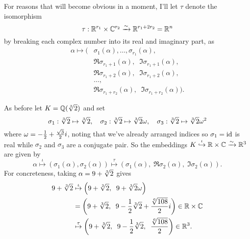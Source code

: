 For reasons that will become obvious in a moment, I'll let $\tau$ denote the isomorphism
\[
	\tau : \mathbb R^{r_1} \times \mathbb C^{r_2} \xrightarrow{\sim} \mathbb R^{r_1+2r_2} = \mathbb R^n
\]
by breaking each complex number into its real and imaginary part, as
\begin{align*}
\alpha \mapsto  \big(& \sigma_1(\alpha), \dots, \sigma_{r_1}(\alpha), \\
& \Re \sigma_{r_1+1}(\alpha), \;\; \Im \sigma_{r_1+1}(\alpha), \\
& \Re \sigma_{r_1+2}(\alpha), \;\; \Im \sigma_{r_1+2}(\alpha), \\
& \dots, \\
& \Re \sigma_{r_1+r_2}(\alpha), \;\; \Im \sigma_{r_1+r_2}(\alpha) \big). 
\end{align*}
\begin{example}
	As before let $K = \mathbb Q(\sqrt[3]{2})$ and set
	\[ \sigma_1 : \sqrt[3]{2} \mapsto \sqrt[3]{2},
		\quad
		\sigma_2 : \sqrt[3]{2} \mapsto \sqrt[3]{2} \omega,
		\quad
		\sigma_3 : \sqrt[3]{2} \mapsto \sqrt[3]{2} \omega^2 \]
	where $\omega = - \frac{1}{2} + \frac{\sqrt3}{2} i$,
	noting that we've already arranged indices so $\sigma_1 = \mathrm{id}$ is real
	while $\sigma_2$ and $\sigma_3$ are a conjugate pair.
	So the embeddings $K \overset\iota{\hookrightarrow} \mathbb R \times \mathbb C \xrightarrow{\sim} \mathbb R^3$ are given by
	\[
		\alpha \overset\iota\longmapsto \left( \sigma_1(\alpha), \sigma_2(\alpha) \right)
		\overset\tau\longmapsto \left( \sigma_1(\alpha), \; \Re\sigma_2(\alpha), \; \Im\sigma_2(\alpha)  \right). \]
	For concreteness, taking $\alpha = 9 + \sqrt[3]{2}$ gives
	\begin{align*}
		9 + \sqrt[3]{2} &\overset\iota\mapsto
		\left( 9 + \sqrt[3]{2}, \;\; 9 + \sqrt[3]{2}\omega \right) \\
		&= \left( 9 + \sqrt[3]{2}, \;\;
		9 - \frac{1}{2}\sqrt[3]{2} + \frac{\sqrt[6]{108}}{2} i  \right) \in \mathbb R \times \mathbb C \\
		&\overset\tau\mapsto \left( 9 + \sqrt[3]{2}, \;\; 9 - \frac{1}{2} \sqrt[3]{2},
		\;\; \frac{\sqrt[6]{108}}{2}  \right) \in \mathbb R^3.
	\end{align*}
\end{example}

